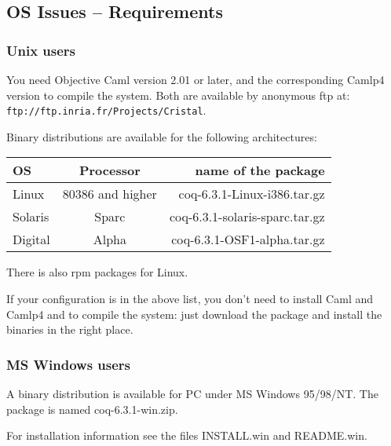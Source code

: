 \documentclass[11pt]{article}
\begin{document}
\subsection{OS Issues -- Requirements}

\subsubsection{Unix users}
You need Objective Caml version 2.01 or later, and the corresponding 
Camlp4 version to compile the system. Both are available by anonymous ftp
at: \\
\verb|ftp://ftp.inria.fr/Projects/Cristal|.
\bigskip

\noindent
Binary distributions are available for the following architectures:

\bigskip
\begin{tabular}{l|c|r}
{\bf OS } & {\bf Processor} & {name of the package}\\
\hline
Linux & 80386 and higher & coq-6.3.1-Linux-i386.tar.gz \\
Solaris & Sparc & coq-6.3.1-solaris-sparc.tar.gz\\
Digital & Alpha & coq-6.3.1-OSF1-alpha.tar.gz\\
\end{tabular}
\bigskip

There is also rpm packages for Linux.

\bigskip

If your configuration is in the above list, you don't need to install
Caml and Camlp4 and to compile the system: 
just download the package and install the binaries in the right place.

\subsubsection{MS Windows users}

A binary distribution is available for PC under MS Windows 95/98/NT.
The package is named coq-6.3.1-win.zip.

For installation information see the 
files INSTALL.win and README.win.
\end{document}
